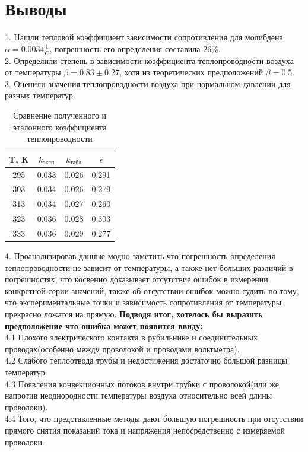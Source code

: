 \documentclass[a4paper, 12pt]{article}%
\begin{document}
	 \section{Выводы}
	 1. Нашли тепловой коэффициент зависимости сопротивления для молибдена $\alpha = 0.0034 \frac{1}{C}$, погрешность его определения составила $26\%$.\\
	 2. Определили степень в зависимости коэффициента теплопроводности воздуха от температуры $\beta = 0.83\pm 0.27$, хотя из теоретических предположений $\beta = 0.5$.\\
	 3. Оценили значения теплопроводности воздуха при нормальном давлении для разных температур.\\
	 \begin{table}[H]
	 	\centering
	 	\begin{tabular}{|c|c|c|c|}
	 		\hline
	 		T, K & $k_{эксп}$ & $k_{табл}$ & $\epsilon$ \\ \hline
	 		295  & 0.033   & 0.026     & 0.291   \\ \hline
	 		303  & 0.034   & 0.026     & 0.279   \\ \hline
	 		313  & 0.034   & 0.027     & 0.260   \\ \hline
	 		323  & 0.036   & 0.028     & 0.303   \\ \hline
	 		333  & 0.036   & 0.029     & 0.277   \\ \hline
	 	\end{tabular}
 		\caption{Сравнение полученного и эталонного коэффициента теплопроводности}
	 \end{table}
	 4. Проанализировав данные модно заметить что погрешность определения теплопроводности не зависит от температуры, а также нет больших различий в погрешностях, что косвенно доказывает отсутствие ошибок в измерении конкретной серии значений, также об отсутствии ошибок можно судить по тому, что экспериментальные точки и зависимость сопротивления от температуры прекрасно ложатся на прямую. \textbf{Подводя итог, хотелось бы выразить предположение что ошибка может появится ввиду:}\\
	 4.1 Плохого электрического контакта в рубильнике и соединительных проводах(особенно между проволокой и проводами вольтметра).\\
	 4.2 Слабого теплоотвода трубы и недостижения достаточно большой разницы температур.\\
	 4.3 Появления конвекционных потоков внутри трубки с проволокой(или же напротив неоднородности температуры воздуха относительно всей длины проволоки).\\
	4.4 Того, что представленные методы дают большую погрешность при отсутствии прямого снятия показаний тока и напряжения непосредственно с измеряемой проволоки.\\
\end{document}
